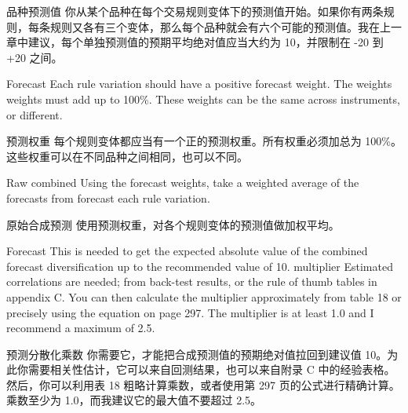 \begin{chineseblock}品种预测值 你从某个品种在每个交易规则变体下的预测值开始。如果你有两条规则，每条规则又各有三个变体，那么每个品种就会有六个可能的预测值。我在上一章中建议，每个单独预测值的预期平均绝对值应当大约为 10，并限制在 -20 到 +20 之间。\end{chineseblock}

\bipairgap

\begin{englishblock} Forecast Each rule variation should have a positive forecast weight. The weights weights must add up to 100\%. These weights can be the same across instruments, or different. \end{englishblock}

\begin{chineseblock}预测权重 每个规则变体都应当有一个正的预测权重。所有权重必须加总为 100\%。这些权重可以在不同品种之间相同，也可以不同。\end{chineseblock}

\bipairgap

\begin{englishblock} Raw combined Using the forecast weights, take a weighted average of the forecasts from forecast each rule variation. \end{englishblock}

\begin{chineseblock}原始合成预测 使用预测权重，对各个规则变体的预测值做加权平均。\end{chineseblock}

\bipairgap

\begin{englishblock} Forecast This is needed to get the expected absolute value of the combined forecast diversification up to the recommended value of 10. multiplier Estimated correlations are needed; from back-test results, or the rule of thumb tables in appendix C. You can then calculate the multiplier approximately from table 18 or precisely using the equation on page 297. The multiplier is at least 1.0 and I recommend a maximum of 2.5. \end{englishblock}

\begin{chineseblock}预测分散化乘数 你需要它，才能把合成预测值的预期绝对值拉回到建议值 10。为此你需要相关性估计，它可以来自回测结果，也可以来自附录 C 中的经验表格。然后，你可以利用表 18 粗略计算乘数，或者使用第 297 页的公式进行精确计算。乘数至少为 1.0，而我建议它的最大值不要超过 2.5。 \end{chineseblock}

